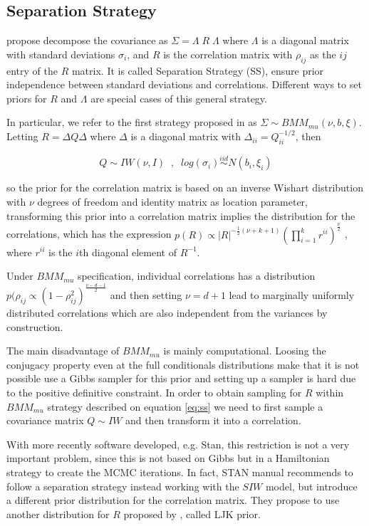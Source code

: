 \documentclass[a4paper]{article}
\begin{document}
\subsection{Separation Strategy \label{ss.sec} }

\cite{barnard2000} propose decompose the covariance as $\Sigma = \Lambda \; R \; \Lambda$  where $\Lambda$ is a diagonal matrix with  standard deviations $\sigma_{i}$, and $R$ is the correlation matrix with $\rho_{ij}$  as the $ij$ entry of the $R$ matrix. It is called Separation Strategy (SS), ensure prior independence between standard deviations and correlations.  Different ways to set priors for $R$ and $\Lambda$ are special cases of this general strategy. 

In particular, we refer to the first strategy proposed in \cite{barnard2000} as $\Sigma \sim BMM_{mu}(\nu,b,\xi)$.  Letting $R = \Delta Q \Delta$ where $\Delta$ is a diagonal matrix with $\Delta_{ii} = Q_{ii}^{-1/2}$, then 

\begin{equation}
Q \sim IW(\nu, I ) \;\;, \;\;  log(\sigma_i) \stackrel{iid} \sim N(b_i, \xi_i)
\label{eq:ss}
\end{equation} 

so the prior for the correlation matrix is based on an inverse Wishart distribution with $\nu$ degrees of freedom and identity matrix as location parameter, transforming this prior into a correlation matrix implies the distribution for the correlations, which has the expression  $p(R) \propto |R|^{-\frac{1}{2}(\nu+k+1) }  (\prod_{i=1}^k r^{ii}) ^{\frac{\nu}{2}}$ , where $r^{ii}$ is the $i$th diagonal element of $R^{-1}$. 

Under $BMM_{mu}$ specification, individual correlations has a distribution $p(\rho_{ij} \propto (1-\rho_{ij}^2)^{\frac{\nu-d-1}{2}}$ and then setting $\nu=d+1$ lead to marginally uniformly distributed correlations which are also independent from the variances by construction. 

The main disadvantage of $BMM_{mu}$ is mainly computational. Loosing the conjugacy property even at the full conditionals distributions make that it is not possible use a Gibbs sampler for this prior and setting up a sampler is hard due to the positive definitive constraint. In order to obtain sampling for $R$ within $BMM_{mu}$ strategy described on equation \ref{eq:ss} we need to first sample a covariance matrix $Q \sim IW$ and then transform it  into a correlation. 

With more recently software developed, e.g. Stan, \citep{stan2014} this restriction is not a very important problem, since this is not based on Gibbs but in a Hamiltonian strategy to create the MCMC iterations.  In fact, STAN manual \citep{stanmanual2014} recommends to follow a separation strategy instead working with the $SIW$ model, but introduce a different prior distribution for the correlation matrix. They propose to use another distribution for $R$ proposed by \cite{lewandowski2009generating}, called LJK prior.   
\end{document}
